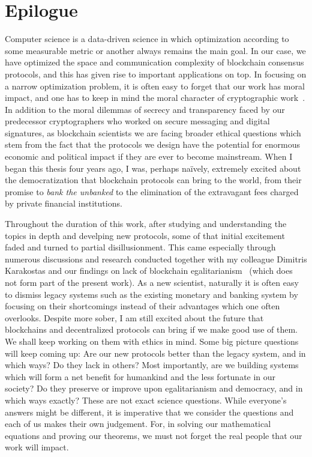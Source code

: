 \section{Epilogue}

Computer science is a data-driven science in which optimization according to
some measurable metric or another always remains the main goal. In our case, we have
optimized the space and communication complexity of blockchain consensus
protocols, and this has given rise to important applications on top. In focusing
on a narrow optimization problem, it is often easy to forget that our work has
moral impact, and one has to keep in mind the moral character of cryptographic
work~\cite{moral}. In addition to the moral dilemmas of secrecy and transparency
faced by our predecessor cryptographers who worked on secure messaging and
digital signatures, as blockchain scientists we are facing broader ethical
questions which stem from the fact that the protocols we design have the
potential for enormous economic and political impact if they are ever to become
mainstream. When I began this thesis four years ago, I was, perhaps na\"ively,
extremely excited about the democratization that blockchain protocols can bring
to the world, from their promise to \emph{bank the unbanked} to the elimination
of the extravagant fees charged by private financial institutions.

Throughout the duration of this work, after studying and understanding the
topics in depth and develping new protocols, some of that initial excitement
faded and turned to partial disillusionment. This came especially through
numerous discussions and research conducted together with my colleague Dimitris
Karakostas and our findings on lack of blockchain
egalitarianism~\cite{egalitarianism} (which does not form part of the present
work). As a new scientist, naturally it is often easy to dismiss legacy systems
such as the existing monetary and banking system by focusing on their
shortcomings instead of their advantages which one often overlooks. Despite more
sober, I am still excited about the future that blockchains and decentralized
protocols can bring if we make good use of them. We shall keep working on them
with ethics in mind. Some big picture questions will keep coming up: Are our new
protocols better than the legacy system, and in which ways? Do they lack in
others? Most importantly, are we building systems which will form a net benefit
for humankind and the less fortunate in our society? Do they preserve or improve
upon egalitarianism and democracy, and in which ways exactly? These are not
exact science questions. While everyone's answers might be different, it is
imperative that we consider the questions and each of us makes their own
judgement. For, in solving our mathematical equations and proving our theorems,
we must not forget the real people that our work will impact.
